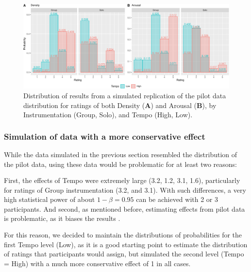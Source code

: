 \documentclass[
  bookmarksnumbered]{article}
\begin{document}
\begin{figure}
\centering
\includegraphics{Power_analysis_files/figure-latex/pilot-rep-1.pdf}
\caption{\label{fig:pilot-rep}Distribution of results from a simulated replication of the pilot data distribution for ratings of both Density (\textbf{A}) and Arousal (\textbf{B}), by Instrumentation (Group, Solo), and Tempo (High, Low).}
\end{figure}

\hypertarget{simulation-of-data-with-a-more-conservative-effect}{%
\subsubsection{Simulation of data with a more conservative effect}\label{simulation-of-data-with-a-more-conservative-effect}}

While the data simulated in the previous section resembled the distribution of the pilot data, using these data would be problematic for at least two reasons:

First, the effects of Tempo were extremely large (3.2, 1.2, 3.1, 1.6), particularly for ratings of Group instrumentation (3.2, and 3.1). With such differences, a very high statistical power of about \(1 - \beta = 0.95\) can be achieved with 2 or 3 participants. And second, as mentioned before, estimating effects from pilot data is problematic, as it biases the results \autocite{albersWhenPowerAnalyses2018}.

For this reason, we decided to maintain the distributions of probabilities for the first Tempo level (Low), as it is a good starting point to estimate the distribution of ratings that participants would assign, but simulated the second level (Tempo = High) with a much more conservative effect of 1 in all cases.
\end{document}

